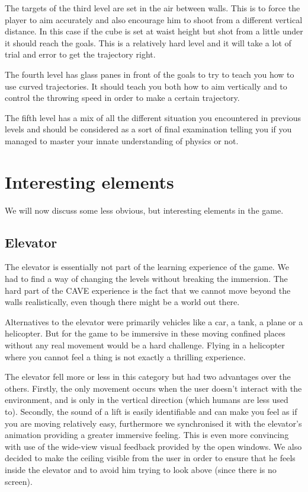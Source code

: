 \documentclass[a4paper]{article}
\begin{document}
The targets of the third level are set in the air between walls. This is to
force the player to aim accurately and also encourage him to shoot from a
different vertical distance. In this case if the cube is set at waist height but
shot from a little under it should reach the goals. This is a relatively hard
level and it will take a lot of trial and error to get the trajectory right.

The fourth level has glass panes in front of the goals to try to teach you how
to use curved trajectories. It should teach you both how to aim vertically and
to control the throwing speed in order to make a certain trajectory.

The fifth level has a mix of all the different situation you encountered in
previous levels and should be considered as a sort of final examination telling
you if you managed to master your innate understanding of physics or not.


\section{Interesting elements}
\label{sec:elements}
We will now discuss some less obvious, but interesting elements in the game.

\subsection{Elevator}

The elevator is essentially not part of the learning experience of the game.
We had to find a way of changing the levels without breaking the immersion.
The hard part of the CAVE experience is the fact that we cannot move beyond
the walls realistically, even though there might be a world out there.

Alternatives to the elevator were primarily vehicles like a car, a tank, a
plane or a helicopter. But for the game to be immersive in these moving confined places
without any real movement would be a hard challenge. Flying in a helicopter
where you cannot feel a thing is not exactly a thrilling experience.

The elevator fell more or less in this category but had two advantages over the
others. Firstly, the only movement occurs when the user doesn't interact with the
environment, and is only in the vertical direction (which humans are less used to).
Secondly, the sound of a lift is easily identifiable and can make you feel as if
you are moving relatively easy, furthermore we synchronised it with the elevator's
animation providing a greater immersive feeling. This is even more convincing with use of the 
wide-view visual feedback provided by the open windows. We also decided to make the ceiling
visible from the user in order to ensure that he feels inside the elevator and to avoid him 
trying to look above (since there is no screen).
\end{document}
